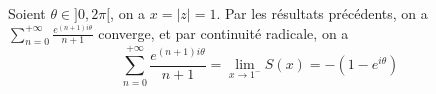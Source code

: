 \documentclass[a4paper,12pt]{book}
\begin{document}
Soient $\theta \in ]0,2\pi[$, on a $x=|z|=1$. Par les résultats précédents, on a $\sum_{n=0}^{+\infty} \frac{e^{(n+1)i\theta}}{n+1}$ converge, et 
par continuité radicale, on a 
$$
\boxed{\sum_{n=0}^{+\infty} \frac{e^{(n+1)i\theta}}{n+1}=\lim_{x\to 1^-}S(x)=-(1-e^{i\theta})}
$$


 
\end{document}
